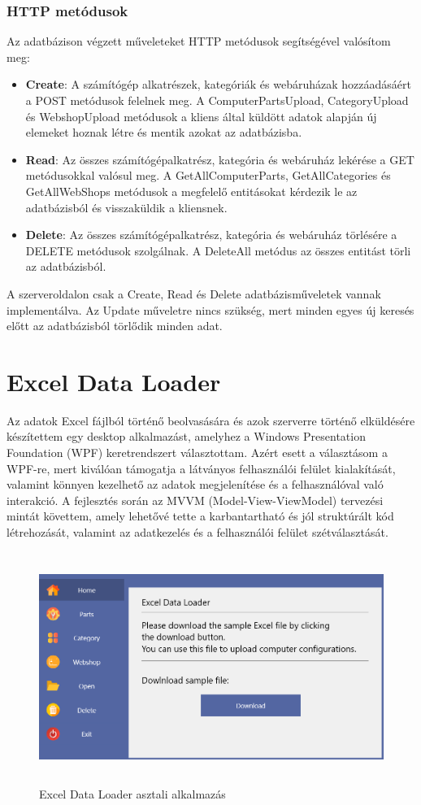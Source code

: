 \documentclass[
]{thesis-ekf}
\theoremstyle{definition}
\theoremstyle{remark}
\begin{document}
\subsubsection{HTTP metódusok}
Az adatbázison végzett műveleteket HTTP metódusok segítségével valósítom meg:
\begin{itemize}
	\item \textbf{Create}: A számítógép alkatrészek, kategóriák és webáruházak hozzáadásáért a POST metódusok felelnek meg. A ComputerPartsUpload, CategoryUpload és WebshopUpload metódusok a kliens által küldött adatok alapján új elemeket hoznak létre és mentik azokat az adatbázisba.

	\item \textbf{Read}: Az összes számítógépalkatrész, kategória és webáruház lekérése a GET metódusokkal valósul meg. A GetAllComputerParts, GetAllCategories és GetAllWebShops metódusok a megfelelő entitásokat kérdezik le az adatbázisból és visszaküldik  a kliensnek.

	\item \textbf{Delete}: Az összes számítógépalkatrész, kategória és webáruház törlésére a DELETE metódusok szolgálnak. A DeleteAll metódus az összes entitást törli az adatbázisból.
\end{itemize}
A szerveroldalon csak a Create, Read és Delete adatbázisműveletek vannak implementálva. Az Update műveletre nincs szükség, mert minden egyes új keresés előtt az adatbázisból törlődik minden adat.



\section{Excel Data Loader}
Az adatok Excel fájlból történő beolvasására és azok szerverre történő elküldésére készítettem egy desktop alkalmazást, amelyhez a Windows Presentation Foundation (WPF) keretrendszert választottam. Azért esett a választásom a WPF-re, mert kiválóan támogatja a látványos felhasználói felület kialakítását, valamint könnyen kezelhető az adatok megjelenítése és a felhasználóval való interakció. A fejlesztés során az MVVM (Model-View-ViewModel) tervezési mintát követtem, amely lehetővé tette a karbantartható és jól struktúrált kód létrehozását, valamint az adatkezelés és a felhasználói felület szétválasztását. 
\begin{figure}[!ht]
	\centering
	\includegraphics[width=15cm, height=7.5cm]{ExcelDataLoader}
	\caption{Excel Data Loader asztali alkalmazás}
	\label{picture-ExcelDataLoader}
\end{figure}
\end{document}
